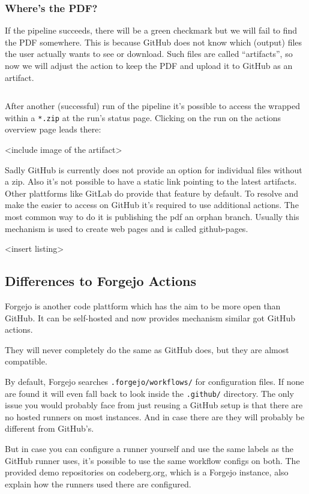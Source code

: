 \documentclass[final]{ltugboat}
\newcommand*{\file}[1]{\texttt{#1}}
\newcommand*{\directory}[1]{\texttt{#1}}
\begin{document}
\subsubsection{Where's the PDF?}
If the pipeline succeeds, there will be a green checkmark but we will fail to find the PDF somewhere.
This is because GitHub does not know which (output) files the user actually wants to see or download.
Such files are called \enquote{artifacts}, so now we will adjust the action to keep the PDF and upload it to GitHub as an artifact.

\inputminted[firstline=13, lastline=17,gobble=3]{yaml}{examples/latex-basic.yml}

After another (successful) run of the pipeline it's possible to access the  wrapped within a  \file{*.zip} at the run's status page.
Clicking on the run on the actions overview page leads there:

<include image of the artifact>

Sadly GitHub is currently does not provide an option for individual files without a zip.
Also it's not possible to have a static link pointing to the latest artifacts.
Other plattforms like GitLab do provide that feature by default.
To resolve and make the  easier to access on GitHub it's required to use additional actions.
The most common way to do it is publishing the pdf an orphan branch.
Usually this mechanism is used to create web pages and is called github-pages.

<insert listing>

\subsection{Differences to Forgejo Actions}
Forgejo\cite{forgejo} is another code plattform which has the aim to be more open than GitHub.
It can be self-hosted and now provides mechanism similar got GitHub actions.

They will never completely do the same as GitHub does, but they are almost compatible.

By default, Forgejo searches \directory{.forgejo/workflows/} for configuration files.
If none are found it will even fall back to look inside the \directory{.github/} directory.
The only issue you would probably face from just reusing a GitHub setup is that there are no hosted runners on most instances.
And in case there are they will probably be different from GitHub's.

But in case you can configure a runner yourself and use the same labels as the GitHub runner \cite[described in]{forgejo-runner-config} uses, it's possible to use the same workflow configs on both.
The provided demo repositories on codeberg.org, which is a Forgejo instance, also explain how the runners used there are configured.
\end{document}
